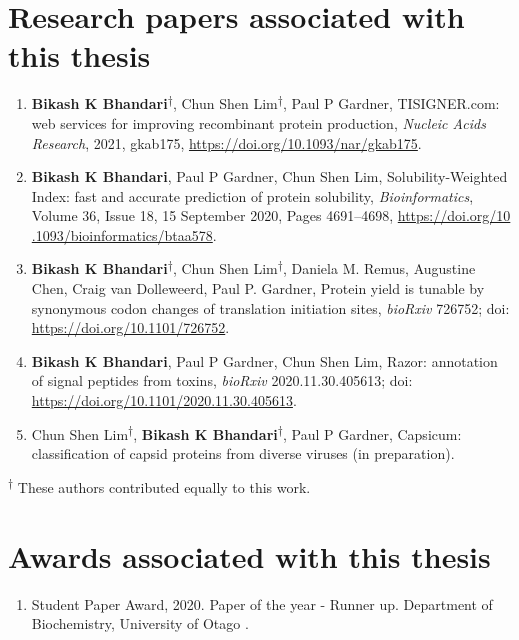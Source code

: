 \section*{Research papers associated with this thesis}
\begin{enumerate}
	
		
	\item \textbf{Bikash K Bhandari}\textsuperscript{$\dagger$}, Chun Shen Lim\textsuperscript{$\dagger$}, Paul P Gardner, TISIGNER.com: web services for improving recombinant protein production, \textit{Nucleic Acids Research}, 2021, gkab175, \href{https://doi.org/10.1093/nar/gkab175}{https://doi.org/10.1093/nar/gkab175}.
	
	\item \textbf{Bikash K Bhandari}, Paul P Gardner, Chun Shen Lim, Solubility-Weighted Index: fast and accurate prediction of protein solubility, \textit{Bioinformatics}, Volume 36, Issue 18, 15 September 2020, Pages 4691–4698, \href{https://doi.org/10.1093/bioinformatics/btaa578}{https://doi.org/10\\.1093/bioinformatics/btaa578}.
	
	\item \textbf{Bikash K Bhandari}\textsuperscript{$\dagger$}, Chun Shen Lim\textsuperscript{$\dagger$}, Daniela M. Remus, Augustine Chen, Craig van Dolleweerd, Paul P. Gardner, Protein yield is tunable by synonymous codon changes of translation initiation sites, \textit{bioRxiv} 726752; doi: \href{https://doi.org/10.1101/726752}{https://doi.org/10.1101/726752}.
	
	
	\item \textbf{Bikash K Bhandari}, Paul P Gardner, Chun Shen Lim, Razor: annotation of signal peptides from toxins, \textit{bioRxiv} 2020.11.30.405613; doi: \href{https://doi.org/10.1101/2020.11.30.405613}{https://doi.org/10.1101/2020.11.30.405613}.
	
	\item Chun Shen Lim\textsuperscript{$\dagger$}, \textbf{Bikash K Bhandari}\textsuperscript{$\dagger$}, Paul P Gardner, Capsicum: classification of capsid proteins from diverse viruses (in preparation).


	
\end{enumerate}

\textsuperscript{$\dagger$} These authors contributed equally to this work.



\section*{Awards associated with this thesis}
\begin{enumerate}
	\item Student Paper Award, 2020. Paper of the year - Runner up. Department of Biochemistry, University of Otago \cite{Bhandari2020-pz}.

\end{enumerate}
